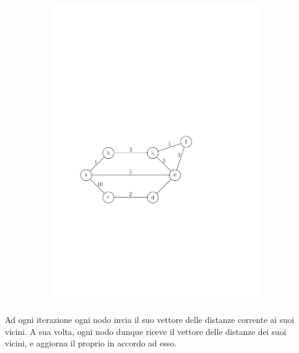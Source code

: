 \documentclass[10pt,xcolor=dvipsnames]{beamer}
\begin{document}
\begin{frame}
\begin{figure}[h]
\begin{subfigure}[b]{0.6\textwidth}
		\hspace*{22pt}\includegraphics[width=.85\linewidth]{routing_table_graph.pdf}
		\end{subfigure}
	\end{figure}
\end{frame}

\begin{frame}
	\frametitle{}
	Ad ogni iterazione ogni nodo invia il suo vettore delle distanze corrente ai suoi vicini.
	\vfill
	A sua volta, ogni nodo dunque riceve il vettore delle distanze dei suoi vicini, e aggiorna
	il proprio in accordo ad esso.
\end{frame}
\end{document}
